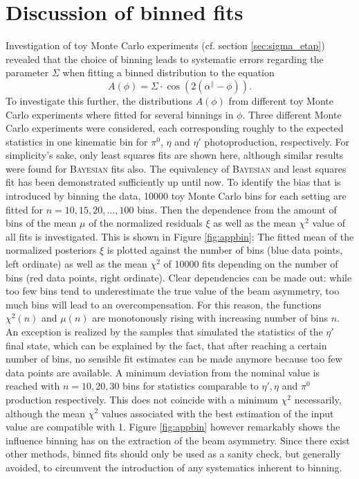 \chapter{Discussion of binned fits}
\label{app:binnedfits}
Investigation of toy Monte Carlo experiments (cf. section \ref{sec:sigma_etap}) revealed that the choice of binning leads to systematic errors regarding the parameter $\Sigma$ when fitting a binned distribution to the equation 
\begin{equation}
	A\left(\phi\right)=\Sigma\cdot\cos\left(2\left(\alpha^\parallel-\phi\right)\right).
\end{equation}
To investigate this further, the distributions $A\left(\phi\right)$ from different toy Monte Carlo experiments where fitted for several binnings in $\phi$. Three different Monte Carlo experiments were considered, each corresponding roughly to the expected statistics in one kinematic bin for $\pi^0$, $\eta$ and $\eta'$ photoproduction, respectively. For simplicity's sake, only least squares fits are shown here, although similar results were found for \textsc{Bayesian} fits also. The equivalency of \textsc{Bayesian} and least squares fit has been demonstrated sufficiently up until now. To identify the bias that is introduced by binning the data, 10000 toy Monte Carlo bins for each setting are fitted for $n=10,15,20,\dots,100$ bins. Then the dependence from the amount of bins of the mean $\mu$ of the normalized residuals $\xi$ as well as the mean $\chi^2$ value of all fits is investigated. This is shown in Figure \ref{fig:appbin}; The fitted mean of the normalized posteriors $\xi$ is plotted against the number of bins (blue data points, left ordinate) as well as the mean $\chi^2$ of 10000 fits depending on the number of bins (red data points, right ordinate). Clear dependencies can be made out: while too few bins tend to underestimate the true value of the beam asymmetry, too much bins will lead to an overcompensation. For this reason, the functions $\chi^2(n)$ and $\mu(n)$ are monotonously rising with increasing number of bins $n$. An exception is realized by the samples that simulated the statistics of the $\eta'$ final state, which can be explained by the fact, that after reaching a certain number of bins, no sensible fit estimates can be made anymore because too few data points are available. A minimum deviation from the nominal value is reached with $n=10,20,30$ bins for statistics comparable to $\eta',\eta$ and $\pi^0$ production respectively. This does not coincide with a minimum $\chi^2$ necessarily, although the mean $\chi^2$ values associated with the best estimation of the input value are compatible with 1. Figure \ref{fig:appbin} however remarkably shows the influence binning has on the extraction of the beam asymmetry. Since there exist other methods, binned fits should only be used as a sanity check, but generally avoided, to circumvent the introduction of any systematics inherent to binning.
